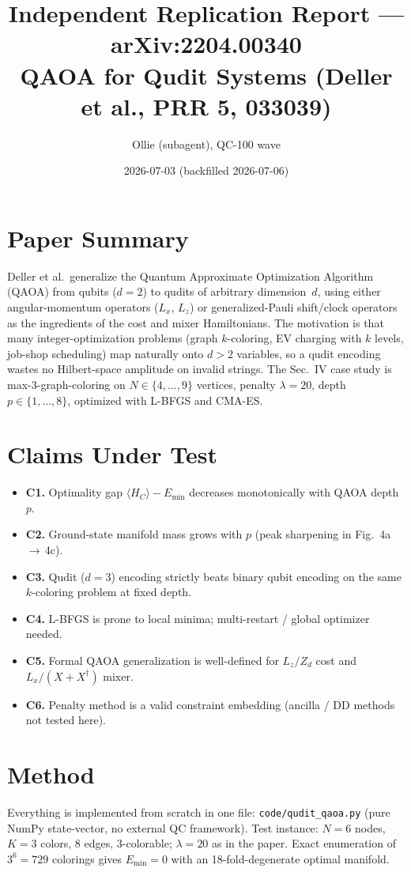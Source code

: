 \documentclass[11pt]{article}
\title{Independent Replication Report --- arXiv:2204.00340\\
\large QAOA for Qudit Systems (Deller et al., PRR 5, 033039)}
\author{Ollie (subagent), QC-100 wave}
\date{2026-07-03 (backfilled 2026-07-06)}
\begin{document}
\maketitle

\section{Paper Summary}
Deller et al.\ generalize the Quantum Approximate Optimization Algorithm (QAOA)
from qubits ($d=2$) to qudits of arbitrary dimension~$d$, using either
angular-momentum operators ($L_x$, $L_z$) or generalized-Pauli shift/clock
operators as the ingredients of the cost and mixer Hamiltonians. The
motivation is that many integer-optimization problems (graph $k$-coloring,
EV charging with $k$ levels, job-shop scheduling) map naturally onto $d>2$
variables, so a qudit encoding wastes no Hilbert-space amplitude on
invalid strings. The Sec.~IV case study is max-$3$-graph-coloring on
$N\in\{4,\dots,9\}$ vertices, penalty $\lambda=20$, depth $p\in\{1,\dots,8\}$,
optimized with L-BFGS and CMA-ES.

\section{Claims Under Test}
\begin{itemize}
  \item \textbf{C1.} Optimality gap $\langle H_C\rangle-E_{\min}$ decreases monotonically with QAOA depth $p$.
  \item \textbf{C2.} Ground-state manifold mass grows with $p$ (peak sharpening in Fig.~4a\,$\to$\,4c).
  \item \textbf{C3.} Qudit ($d=3$) encoding strictly beats binary qubit encoding on the same $k$-coloring problem at fixed depth.
  \item \textbf{C4.} L-BFGS is prone to local minima; multi-restart / global optimizer needed.
  \item \textbf{C5.} Formal QAOA generalization is well-defined for $L_z/Z_d$ cost and $L_x/(X{+}X^\dagger)$ mixer.
  \item \textbf{C6.} Penalty method is a valid constraint embedding (ancilla / DD methods not tested here).
\end{itemize}

\section{Method}
Everything is implemented from scratch in one file: \texttt{code/qudit\_qaoa.py}
(pure NumPy state-vector, no external QC framework).
Test instance: $N=6$ nodes, $K=3$ colors, 8 edges,
$3$-colorable; $\lambda=20$ as in the paper.
Exact enumeration of $3^6=729$ colorings gives $E_{\min}=0$ with an
18-fold-degenerate optimal manifold.
\end{document}
